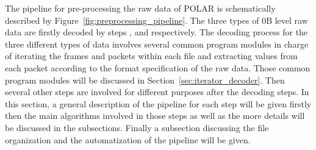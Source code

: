 \documentclass{raa}
\begin{document}
The pipeline for pre-processing the raw data of POLAR is schematically described by Figure~\ref{fig:preprocessing_pipeline}. The three types of 0B level raw data are firstly decoded by steps ,  and  respectively. The decoding process for the three different types of data involves several common program modules in charge of iterating the frames and packets within each file and extracting values from each packet according to the format specification of the raw data. Those common program modules will be discussed in Section~\ref{sec:iterator_decoder}. Then several other steps are involved for different purposes after the decoding steps. In this section, a general description of the pipeline for each step will be given firstly then the main algorithms involved in those steps as well as the more details will be discussed in the subsections. Finally a subsection discussing the file organization and the automatization of the pipeline will be given.
\end{document}
